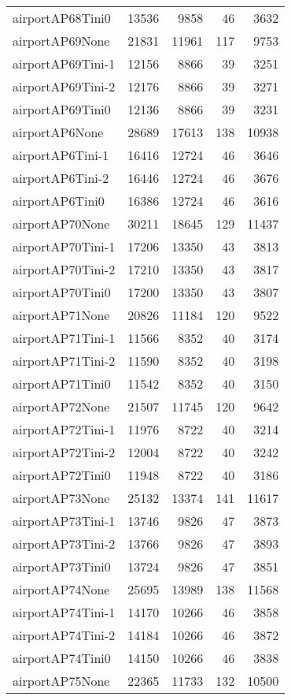 \begin{longtable}{lrrrr}
airportAP68Tini0 & 13536 & 9858 & 46 & 3632 \\
airportAP69None & 21831 & 11961 & 117 & 9753 \\
airportAP69Tini-1 & 12156 & 8866 & 39 & 3251 \\
airportAP69Tini-2 & 12176 & 8866 & 39 & 3271 \\
airportAP69Tini0 & 12136 & 8866 & 39 & 3231 \\
airportAP6None & 28689 & 17613 & 138 & 10938 \\
airportAP6Tini-1 & 16416 & 12724 & 46 & 3646 \\
airportAP6Tini-2 & 16446 & 12724 & 46 & 3676 \\
airportAP6Tini0 & 16386 & 12724 & 46 & 3616 \\
airportAP70None & 30211 & 18645 & 129 & 11437 \\
airportAP70Tini-1 & 17206 & 13350 & 43 & 3813 \\
airportAP70Tini-2 & 17210 & 13350 & 43 & 3817 \\
airportAP70Tini0 & 17200 & 13350 & 43 & 3807 \\
airportAP71None & 20826 & 11184 & 120 & 9522 \\
airportAP71Tini-1 & 11566 & 8352 & 40 & 3174 \\
airportAP71Tini-2 & 11590 & 8352 & 40 & 3198 \\
airportAP71Tini0 & 11542 & 8352 & 40 & 3150 \\
airportAP72None & 21507 & 11745 & 120 & 9642 \\
airportAP72Tini-1 & 11976 & 8722 & 40 & 3214 \\
airportAP72Tini-2 & 12004 & 8722 & 40 & 3242 \\
airportAP72Tini0 & 11948 & 8722 & 40 & 3186 \\
airportAP73None & 25132 & 13374 & 141 & 11617 \\
airportAP73Tini-1 & 13746 & 9826 & 47 & 3873 \\
airportAP73Tini-2 & 13766 & 9826 & 47 & 3893 \\
airportAP73Tini0 & 13724 & 9826 & 47 & 3851 \\
airportAP74None & 25695 & 13989 & 138 & 11568 \\
airportAP74Tini-1 & 14170 & 10266 & 46 & 3858 \\
airportAP74Tini-2 & 14184 & 10266 & 46 & 3872 \\
airportAP74Tini0 & 14150 & 10266 & 46 & 3838 \\
airportAP75None & 22365 & 11733 & 132 & 10500 \\

\end{longtable}
